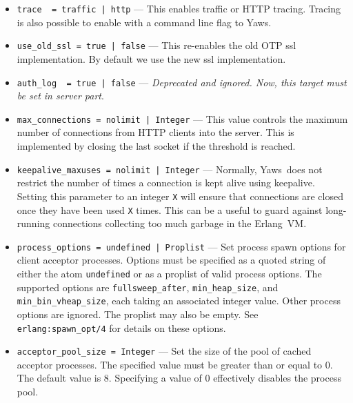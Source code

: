 \documentclass[11pt,oneside,english]{book}
\newcommand{\Erlang}            %
        {{\sc Erlang}}
\newcommand{\Yaws}            %
        {{\sc Yaws}}
\begin{document}
\begin{itemize}
\item        \verb+trace  = traffic | http+ ---
              This  enables  traffic  or HTTP tracing. Tracing is
              also possible to enable with a command line flag to
              \Yaws{}.

\item        \verb+use_old_ssl = true | false+ ---
              This re-enables the old OTP ssl implementation. By default we use
              the new ssl implementation.

\item        \verb+auth_log  = true | false+ ---
              \textit{Deprecated and ignored. Now, this target must be set in
                server part}.

\item        \verb+max_connections = nolimit | Integer+ ---
              This value controls the maximum number of connections
              from HTTP clients into the server. This is implemented
              by closing the last socket if the threshold is reached.

\item        \verb+keepalive_maxuses = nolimit | Integer+ ---
              Normally, \Yaws\ does not restrict the number of times a
              connection is kept alive using keepalive. Setting this
              parameter to an integer \verb+X+ will ensure that
              connections are closed once they have been used \verb+X+
              times.  This can be a useful to guard against
              long-running connections collecting too much garbage in
              the \Erlang\ VM.

\item        \verb+process_options = undefined | Proplist+ ---
              Set process spawn options for client acceptor processes.
              Options must be specified as a quoted string of either
              the atom \verb+undefined+ or as a proplist of valid
              process options. The supported options are
              \verb+fullsweep_after+, \verb+min_heap_size+, and
              \verb+min_bin_vheap_size+, each taking an associated
              integer value. Other process options are ignored. The
              proplist may also be empty. See
              \verb+erlang:spawn_opt/4+ for details on these options.

\item        \verb+acceptor_pool_size = Integer+ ---
              Set the size of the pool of cached acceptor
              processes. The specified value must be greater than or
              equal to 0. The default value is 8. Specifying a value
              of 0 effectively disables the process pool.


\end{itemize}
\end{document}
